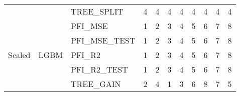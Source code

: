 \begin{table}
\begin{tabular}{lllrrrrrrrr}
 &  & TREE\_SPLIT & {\cellcolor[HTML]{3B4CC0}} \color[HTML]{F1F1F1} 4 & {\cellcolor[HTML]{3B4CC0}} \color[HTML]{F1F1F1} 4 & {\cellcolor[HTML]{3B4CC0}} \color[HTML]{F1F1F1} 4 & {\cellcolor[HTML]{3B4CC0}} \color[HTML]{F1F1F1} 4 & {\cellcolor[HTML]{3B4CC0}} \color[HTML]{F1F1F1} 4 & {\cellcolor[HTML]{3B4CC0}} \color[HTML]{F1F1F1} 4 & {\cellcolor[HTML]{3B4CC0}} \color[HTML]{F1F1F1} 4 & {\cellcolor[HTML]{3B4CC0}} \color[HTML]{F1F1F1} 4 \\
\cline{1-11} \cline{2-11}
\multirow[c]{18}{*}{Scaled} & \multirow[c]{9}{*}{LGBM} & PFI\_MSE & {\cellcolor[HTML]{3B4CC0}} \color[HTML]{F1F1F1} 1 & {\cellcolor[HTML]{6788EE}} \color[HTML]{F1F1F1} 2 & {\cellcolor[HTML]{9ABBFF}} \color[HTML]{000000} 3 & {\cellcolor[HTML]{C9D7F0}} \color[HTML]{000000} 4 & {\cellcolor[HTML]{EDD1C2}} \color[HTML]{000000} 5 & {\cellcolor[HTML]{F7A889}} \color[HTML]{000000} 6 & {\cellcolor[HTML]{E26952}} \color[HTML]{F1F1F1} 7 & {\cellcolor[HTML]{B40426}} \color[HTML]{F1F1F1} 8 \\
 &  & PFI\_MSE\_TEST & {\cellcolor[HTML]{3B4CC0}} \color[HTML]{F1F1F1} 1 & {\cellcolor[HTML]{6788EE}} \color[HTML]{F1F1F1} 2 & {\cellcolor[HTML]{9ABBFF}} \color[HTML]{000000} 3 & {\cellcolor[HTML]{C9D7F0}} \color[HTML]{000000} 4 & {\cellcolor[HTML]{EDD1C2}} \color[HTML]{000000} 5 & {\cellcolor[HTML]{F7A889}} \color[HTML]{000000} 6 & {\cellcolor[HTML]{E26952}} \color[HTML]{F1F1F1} 7 & {\cellcolor[HTML]{B40426}} \color[HTML]{F1F1F1} 8 \\
 &  & PFI\_R2 & {\cellcolor[HTML]{3B4CC0}} \color[HTML]{F1F1F1} 1 & {\cellcolor[HTML]{6788EE}} \color[HTML]{F1F1F1} 2 & {\cellcolor[HTML]{9ABBFF}} \color[HTML]{000000} 3 & {\cellcolor[HTML]{C9D7F0}} \color[HTML]{000000} 4 & {\cellcolor[HTML]{EDD1C2}} \color[HTML]{000000} 5 & {\cellcolor[HTML]{F7A889}} \color[HTML]{000000} 6 & {\cellcolor[HTML]{E26952}} \color[HTML]{F1F1F1} 7 & {\cellcolor[HTML]{B40426}} \color[HTML]{F1F1F1} 8 \\
 &  & PFI\_R2\_TEST & {\cellcolor[HTML]{3B4CC0}} \color[HTML]{F1F1F1} 1 & {\cellcolor[HTML]{6788EE}} \color[HTML]{F1F1F1} 2 & {\cellcolor[HTML]{9ABBFF}} \color[HTML]{000000} 3 & {\cellcolor[HTML]{C9D7F0}} \color[HTML]{000000} 4 & {\cellcolor[HTML]{EDD1C2}} \color[HTML]{000000} 5 & {\cellcolor[HTML]{F7A889}} \color[HTML]{000000} 6 & {\cellcolor[HTML]{E26952}} \color[HTML]{F1F1F1} 7 & {\cellcolor[HTML]{B40426}} \color[HTML]{F1F1F1} 8 \\
 &  & TREE\_GAIN & {\cellcolor[HTML]{6788EE}} \color[HTML]{F1F1F1} 2 & {\cellcolor[HTML]{C9D7F0}} \color[HTML]{000000} 4 & {\cellcolor[HTML]{3B4CC0}} \color[HTML]{F1F1F1} 1 & {\cellcolor[HTML]{9ABBFF}} \color[HTML]{000000} 3 & {\cellcolor[HTML]{F7A889}} \color[HTML]{000000} 6 & {\cellcolor[HTML]{B40426}} \color[HTML]{F1F1F1} 8 & {\cellcolor[HTML]{E26952}} \color[HTML]{F1F1F1} 7 & {\cellcolor[HTML]{EDD1C2}} \color[HTML]{000000} 5 \\

\end{tabular}
\end{table}
